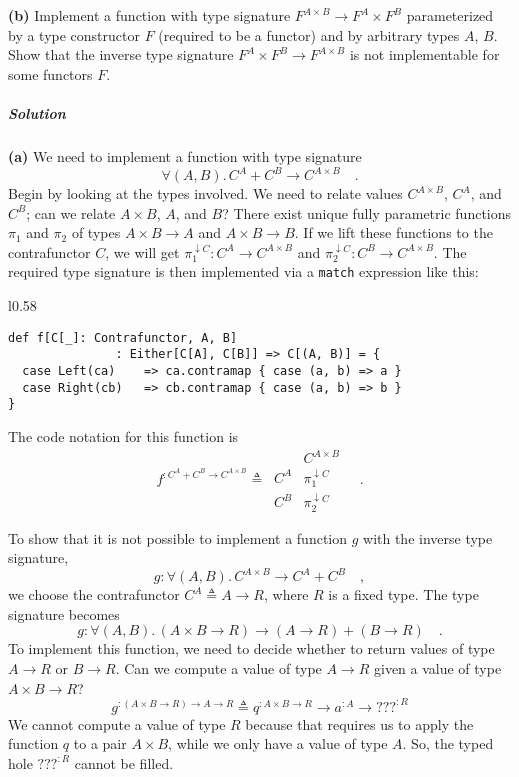 \textbf{(b)} Implement a function with type signature $F^{A\times B}\rightarrow F^{A}\times F^{B}$
parameterized by a type constructor $F$ (required to be a functor)
and by arbitrary types $A$, $B$. Show that the inverse type signature
$F^{A}\times F^{B}\rightarrow F^{A\times B}$ is not implementable
for some functors $F$.

\subparagraph{Solution}

\textbf{(a)} We need to implement a function with type signature
\[
\forall(A,B).\,C^{A}+C^{B}\rightarrow C^{A\times B}\quad.
\]
Begin by looking at the types involved. We need to relate values $C^{A\times B}$,
$C^{A}$, and $C^{B}$; can we relate $A\times B$, $A$, and $B$?
There exist unique fully parametric functions $\pi_{1}$ and $\pi_{2}$
of types $A\times B\rightarrow A$ and $A\times B\rightarrow B$.
If we lift these functions to the contrafunctor $C$, we will get
$\pi_{1}^{\downarrow C}:C^{A}\rightarrow C^{A\times B}$ and $\pi_{2}^{\downarrow C}:C^{B}\rightarrow C^{A\times B}$.
The required type signature is then implemented via a \lstinline!match!
expression like this:

\begin{wrapfigure}{l}{0.58\columnwidth}%
\vspace{-0.75\baselineskip}
\begin{lstlisting}
def f[C[_]: Contrafunctor, A, B]
               : Either[C[A], C[B]] => C[(A, B)] = {
  case Left(ca)    => ca.contramap { case (a, b) => a }
  case Right(cb)   => cb.contramap { case (a, b) => b }
}
\end{lstlisting}

\vspace{-3\baselineskip}
\end{wrapfigure}%

\noindent The code notation for this function is\vspace{-0.25\baselineskip}
\[
f^{:C^{A}+C^{B}\rightarrow C^{A\times B}}\triangleq\,\begin{array}{|c||c|}
 & C^{A\times B}\\
\hline C^{A} & \pi_{1}^{\downarrow C}\\
C^{B} & \pi_{2}^{\downarrow C}
\end{array}\quad.
\]
\vspace{-0.85\baselineskip}

To show that it is not possible to implement a function $g$ with
the inverse type signature,
\[
g:\forall(A,B).\,C^{A\times B}\rightarrow C^{A}+C^{B}\quad,
\]
we choose the contrafunctor $C^{A}\triangleq A\rightarrow R$, where
$R$ is a fixed type. The type signature becomes
\[
g:\forall(A,B).\,(A\times B\rightarrow R)\rightarrow(A\rightarrow R)+(B\rightarrow R)\quad.
\]
To implement this function, we need to decide whether to return values
of type $A\rightarrow R$ or $B\rightarrow R$. Can we compute a value
of type $A\rightarrow R$ given a value of type $A\times B\rightarrow R$?
\[
g^{:(A\times B\rightarrow R)\rightarrow A\rightarrow R}\triangleq q^{:A\times B\rightarrow R}\rightarrow a^{:A}\rightarrow\text{???}^{:R}
\]
We cannot compute a value of type $R$ because that requires us to
apply the function $q$ to a pair $A\times B$, while we only have
a value of type $A$. So, the typed hole $\text{???}^{:R}$ cannot
be filled. 

